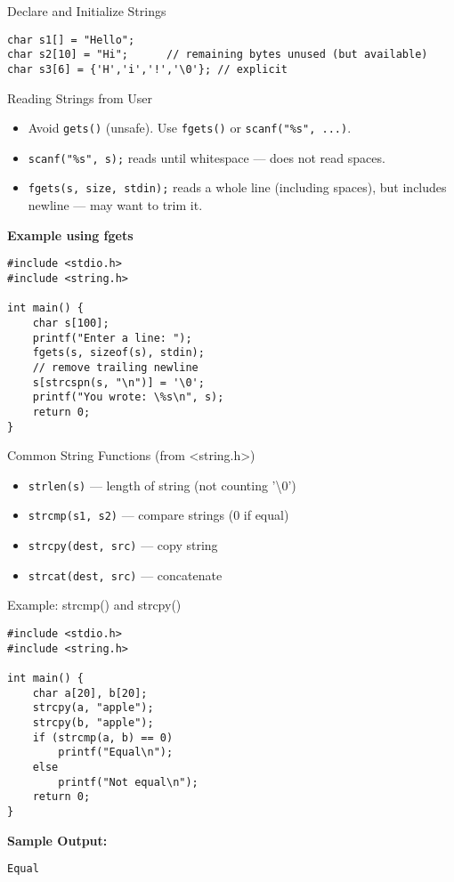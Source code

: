 \documentclass[12pt, aspectratio=169]{beamer}
\begin{document}
    \begin{frame}[fragile]{Declare and Initialize Strings}
        \begin{verbatim}
char s1[] = "Hello";
char s2[10] = "Hi";      // remaining bytes unused (but available)
char s3[6] = {'H','i','!','\0'}; // explicit
        \end{verbatim}
    \end{frame}

    \begin{frame}[fragile]{Reading Strings from User}
        \begin{itemize}
            \item Avoid \texttt{gets()} (unsafe). Use \texttt{fgets()} or \texttt{scanf("\%s", ...)}.
            \item \texttt{scanf("\%s", s);} reads until whitespace — does not read spaces.
            \item \texttt{fgets(s, size, stdin);} reads a whole line (including spaces), but includes newline — may want to trim it.
        \end{itemize}

        \textbf{Example using fgets}
        \begin{verbatim}
#include <stdio.h>
#include <string.h>

int main() {
    char s[100];
    printf("Enter a line: ");
    fgets(s, sizeof(s), stdin);
    // remove trailing newline
    s[strcspn(s, "\n")] = '\0';
    printf("You wrote: \%s\n", s);
    return 0;
}
        \end{verbatim}
    \end{frame}

    \begin{frame}[fragile]{Common String Functions (from <string.h>)}
        \begin{itemize}
            \item \texttt{strlen(s)} — length of string (not counting '\textbackslash0')
            \item \texttt{strcmp(s1, s2)} — compare strings (0 if equal)
            \item \texttt{strcpy(dest, src)} — copy string
            \item \texttt{strcat(dest, src)} — concatenate
        \end{itemize}
    \end{frame}

    \begin{frame}[fragile]{Example: strcmp() and strcpy()}
        \begin{verbatim}
#include <stdio.h>
#include <string.h>

int main() {
    char a[20], b[20];
    strcpy(a, "apple");
    strcpy(b, "apple");
    if (strcmp(a, b) == 0)
        printf("Equal\n");
    else
        printf("Not equal\n");
    return 0;
}
        \end{verbatim}

        \textbf{Sample Output:}
        \begin{verbatim}
Equal
        \end{verbatim}
    \end{frame}
\end{document}
